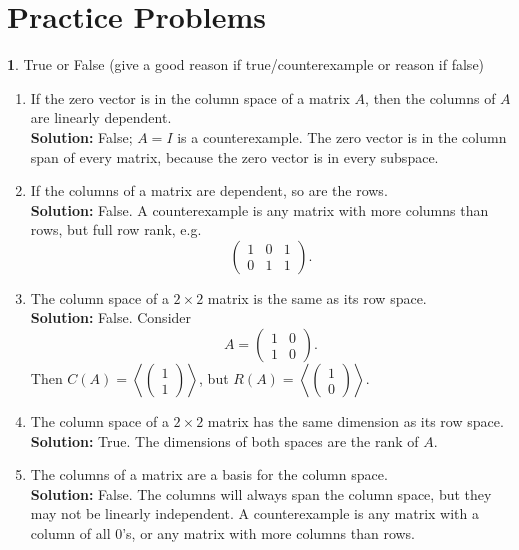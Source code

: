 \documentclass{article}
\theoremstyle{definition}
\newtheorem{prob}{}
\begin{document}
\section*{Practice Problems}
\begin{prob} True or False (give a good reason if true/counterexample or reason if false)

\begin{enumerate}
	
	\item If the zero vector is in the column space of a matrix $A$, then the columns of $A$ are linearly dependent.\\
	\textbf{Solution:} False; $A=I$ is a counterexample. The zero vector is in the column span of every matrix, because the zero vector is in every subspace.
	
	\item If the columns of a matrix are dependent, so are the rows.
	\\
	\textbf{Solution:} False. A counterexample is any matrix with more columns than rows, but full row rank, e.g.
	\[\begin{pmatrix} 1 & 0 & 1\\ 0 & 1 & 1 \end{pmatrix}. \]
	
	\item The column space of a $2 \times 2$ matrix is the same as its row space.\\
	\textbf{Solution:} False. Consider 
	\[A = \begin{pmatrix} 1 & 0 \\ 1 & 0 \end{pmatrix}. \]
Then $C(A) = \left\langle \begin{pmatrix}1 \\ 1 \end{pmatrix} \right\rangle$, but $R(A) =  \left\langle \begin{pmatrix}1 \\ 0 \end{pmatrix} \right\rangle$.
	
	
	\item The column space of a $2 \times 2$ matrix has the same dimension as its row space.\\
	\textbf{Solution:} True. The dimensions of both spaces are the rank of $A$.
	
	\item The columns of a matrix are a basis for the column space.\\
	\textbf{Solution:} False. The columns will always span the column space, but they may not be linearly independent. A counterexample is any matrix with a column of all 0's, or any matrix with more columns than rows.
	

\end{enumerate}
\end{prob}
\end{document}
